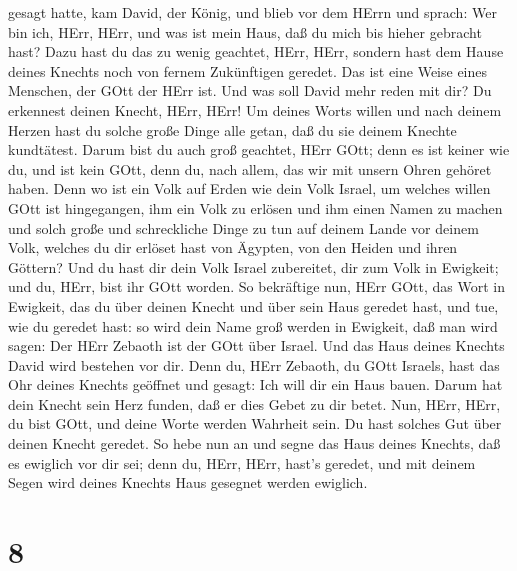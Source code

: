 gesagt hatte,  kam David, der König, und blieb vor dem
HErrn und sprach: Wer bin ich, HErr, HErr, und was ist mein Haus, daß du
mich bis hieher gebracht hast?  Dazu hast du das zu wenig
geachtet, HErr, HErr, sondern hast dem Hause deines Knechts noch von
fernem Zukünftigen geredet. Das ist eine Weise eines Menschen, der GOtt
der HErr ist.  Und was soll David mehr reden mit dir? Du
erkennest deinen Knecht, HErr, HErr!  Um deines Worts
willen und nach deinem Herzen hast du solche große Dinge alle getan, daß
du sie deinem Knechte kundtätest.  Darum bist du auch groß
geachtet, HErr GOtt; denn es ist keiner wie du, und ist kein GOtt, denn
du, nach allem, das wir mit unsern Ohren gehöret haben. 
Denn wo ist ein Volk auf Erden wie dein Volk Israel, um welches willen
GOtt ist hingegangen, ihm ein Volk zu erlösen und ihm einen Namen zu
machen und solch große und schreckliche Dinge zu tun auf deinem Lande
vor deinem Volk, welches du dir erlöset hast von Ägypten, von den Heiden
und ihren Göttern?  Und du hast dir dein Volk Israel
zubereitet, dir zum Volk in Ewigkeit; und du, HErr, bist ihr GOtt
worden.  So bekräftige nun, HErr GOtt, das Wort in
Ewigkeit, das du über deinen Knecht und über sein Haus geredet hast, und
tue, wie du geredet hast:  so wird dein Name groß werden in
Ewigkeit, daß man wird sagen: Der HErr Zebaoth ist der GOtt über Israel.
Und das Haus deines Knechts David wird bestehen vor dir. 
Denn du, HErr Zebaoth, du GOtt Israels, hast das Ohr deines Knechts
geöffnet und gesagt: Ich will dir ein Haus bauen. Darum hat dein Knecht
sein Herz funden, daß er dies Gebet zu dir betet.  Nun,
HErr, HErr, du bist GOtt, und deine Worte werden Wahrheit sein. Du hast
solches Gut über deinen Knecht geredet.  So hebe nun an und
segne das Haus deines Knechts, daß es ewiglich vor dir sei; denn du,
HErr, HErr, hast's geredet, und mit deinem Segen wird deines Knechts
Haus gesegnet werden ewiglich.

\hypertarget{section-7}{%
\section{8}\label{section-7}}

